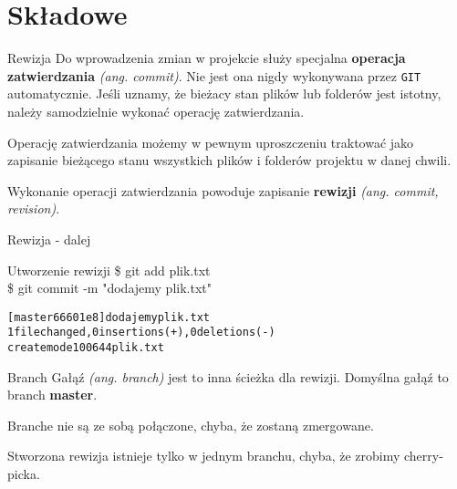 \documentclass{beamer}
\begin{document}

\section{Składowe}

\begin{frame}{Rewizja}
Do wprowadzenia zmian w projekcie służy specjalna \textbf{operacja zatwierdzania} \textit{(ang. commit)}. Nie jest ona nigdy wykonywana przez \texttt{GIT} automatycznie. Jeśli uznamy, że bieżacy stan plików lub folderów jest istotny, należy samodzielnie wykonać operację zatwierdzania.

\vskip 0.5cm
Operację zatwierdzania możemy w pewnym uproszczeniu traktować jako zapisanie bieżącego stanu wszystkich plików i folderów 
projektu w danej chwili.

\vskip 0.5cm
Wykonanie operacji zatwierdzania powoduje zapisanie \textbf{rewizji} \textit{(ang. commit, revision)}.
\end{frame}

\begin{frame}{Rewizja - dalej}
\begin{block}{Utworzenie rewizji}
\$ git add plik.txt \\
\$ git commit -m "dodajemy plik.txt"
\begin{alltt}
[master 66601e8] dodajemy plik.txt \\ 
 1 file changed, 0 insertions(+), 0 deletions(-) \\
 create mode 100644 plik.txt
\end{alltt}
\end{block}
\end{frame}

\begin{frame}{Branch}
Gałąź \textit{(ang. branch)} jest to inna ścieżka dla rewizji.
Domyślna gałąź to branch \textbf{master}.

Branche nie są ze sobą połączone, chyba, że zostaną zmergowane.

Stworzona rewizja istnieje tylko w jednym branchu, chyba, że zrobimy cherry-picka.
\end{frame}
\end{document}
